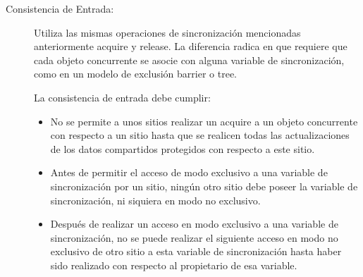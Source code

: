 \begin{description}
\item[Consistencia de Entrada: ]
Utiliza las mismas operaciones de sincronización mencionadas anteriormente acquire y release. La diferencia radica en que requiere que cada objeto concurrente se asocie con alguna variable de sincronización, como en un modelo de exclusión barrier o tree.

La consistencia de entrada debe cumplir:
\begin{itemize}
\item No se permite a unos sitios realizar un acquire a un objeto concurrente con respecto a un sitio hasta que se realicen todas las actualizaciones de los datos compartidos protegidos con respecto a este sitio.
\item Antes de permitir el acceso de modo exclusivo a una variable de sincronización por un sitio, ningún otro sitio debe poseer la variable de sincronización, ni siquiera en modo no exclusivo.
\item Después de realizar un acceso en modo exclusivo a una variable de sincronización, no se puede realizar el siguiente acceso en modo no exclusivo de otro sitio a esta variable de sincronización hasta haber sido realizado con respecto al propietario de esa variable.
\end{itemize}

\end{description}

